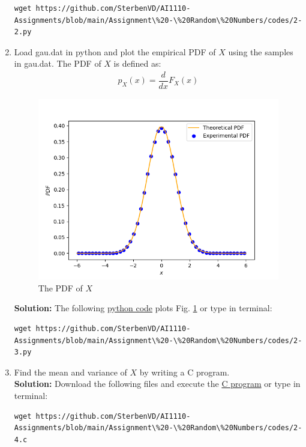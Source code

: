 \documentclass[journal,12pt,twocolumn]{IEEEtran}
\numberwithin{equation}{section}
\renewcommand\thesection{\arabic{section}}
\providecommand{\gitlink}[2]{{\color{blue}\href{https://github.com/SterbenVD/AI1110-Assignments/blob/main/Assignment\%20-\%20Random\%20Numbers/#1}{#2}}}
\newcommand{\solution}{\noindent \textbf{Solution: }}
\begin{document}
\begin{enumerate}[label=\thesection.\arabic*,ref=\thesection.\theenumi]
          \begin{lstlisting}
wget https://github.com/SterbenVD/AI1110-Assignments/blob/main/Assignment\%20-\%20Random\%20Numbers/codes/2-2.py
            \end{lstlisting}
    \item Load gau.dat in python and plot the empirical PDF of $X$ using the samples in gau.dat.
          The PDF of $X$ is defined as:
          \begin{align}
              p_{X}(x) = \dfrac{d}{dx}F_{X}(x)
          \end{align}
          \begin{figure}[H]
              \centering
              \includegraphics[width = \columnwidth]{../figs/2_pdf}
              \caption{The PDF of $X$}
              \label{fig:2_pdf}
          \end{figure}
          \solution The following \gitlink{codes/2-3.py}{python code} plots Fig. \ref{fig:2_pdf} or type in terminal:
          \begin{lstlisting}
wget https://github.com/SterbenVD/AI1110-Assignments/blob/main/Assignment\%20-\%20Random\%20Numbers/codes/2-3.py
            \end{lstlisting}
    \item Find the mean and variance of $X$ by writing a C program.
          \\
          \solution Download the following files and execute the \gitlink{codes/2-4.c}{C program} or type in terminal:
          \begin{lstlisting}
wget https://github.com/SterbenVD/AI1110-Assignments/blob/main/Assignment\%20-\%20Random\%20Numbers/codes/2-4.c

\end{lstlisting}
\end{enumerate}
\end{document}
